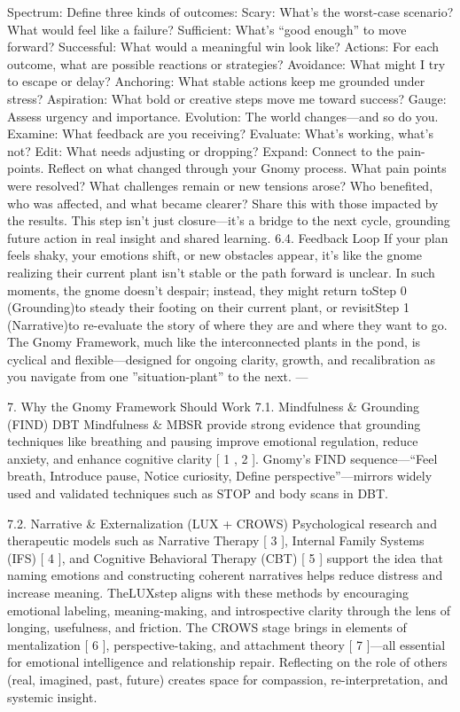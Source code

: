 Spectrum: Define three kinds of outcomes:
Scary: What’s the worst-case scenario? What would feel like a failure?
Sufficient: What’s “good enough” to move forward?
Successful: What would a meaningful win look like?
Actions: For each outcome, what are possible reactions or strategies?
Avoidance: What might I try to escape or delay?
Anchoring: What stable actions keep me grounded under stress?
Aspiration: What bold or creative steps move me toward success?
Gauge: Assess urgency and importance.
Evolution: The world changes—and so do you.
Examine: What feedback are you receiving?
Evaluate: What’s working, what’s not?
Edit: What needs adjusting or dropping?
Expand: Connect to the pain-points. Reflect on what changed through your Gnomy process.
What pain points were resolved? What challenges remain or new tensions arose? Who
benefited, who was affected, and what became clearer? Share this with those impacted by the
results. This step isn’t just closure—it’s a bridge to the next cycle, grounding future action in
real insight and shared learning.
6.4. Feedback Loop
If your plan feels shaky, your emotions shift, or new obstacles appear, it’s like the gnome realizing their
current plant isn’t stable or the path forward is unclear. In such moments, the gnome doesn’t despair;
instead, they might return toStep 0 (Grounding)to steady their footing on their current plant, or
revisitStep 1 (Narrative)to re-evaluate the story of where they are and where they want to go. The
Gnomy Framework, much like the interconnected plants in the pond, is cyclical and flexible—designed for
ongoing clarity, growth, and recalibration as you navigate from one ”situation-plant” to the next. —

7.
Why the Gnomy Framework Should Work
7.1. Mindfulness & Grounding (FIND)
DBT Mindfulness & MBSR provide strong evidence that grounding techniques like breathing and pausing
improve emotional regulation, reduce anxiety, and enhance cognitive clarity [ 1 , 2 ]. Gnomy’s FIND
sequence—“Feel breath, Introduce pause, Notice curiosity, Define perspective”—mirrors widely used and
validated techniques such as STOP and body scans in DBT.

7.2. Narrative & Externalization (LUX + CROWS)
Psychological research and therapeutic models such as Narrative Therapy [ 3 ], Internal Family Systems
(IFS) [ 4 ], and Cognitive Behavioral Therapy (CBT) [ 5 ] support the idea that naming emotions and
constructing coherent narratives helps reduce distress and increase meaning. TheLUXstep aligns with
these methods by encouraging emotional labeling, meaning-making, and introspective clarity through
the lens of longing, usefulness, and friction. The CROWS stage brings in elements of mentalization [ 6 ],
perspective-taking, and attachment theory [ 7 ]—all essential for emotional intelligence and relationship
repair. Reflecting on the role of others (real, imagined, past, future) creates space for compassion,
re-interpretation, and systemic insight.

